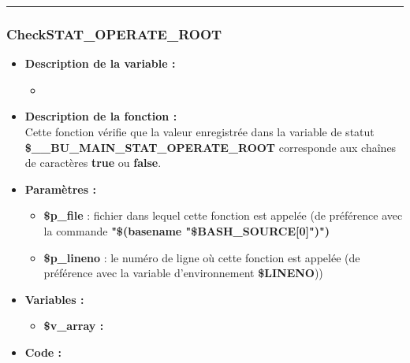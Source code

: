 \documentclass[a4paper,10pt]{article}
\begin{document}
\color{blue}\par\noindent\rule{\textwidth}{0.4pt}\color{white}

\color{blue}
\subsubsection{CheckSTAT\_OPERATE\_ROOT}\color{white}
\begin{itemize}
    \item \textbf{Description de la variable :}
    \begin{itemize}
        \item \textbf{}\\[1\baselineskip]
    \end{itemize}


    \item \textbf{Description de la fonction :}\\
        Cette fonction vérifie que la valeur enregistrée dans la variable de statut\\ \textbf{\color{orange}\$\_\_BU\_MAIN\_STAT\_OPERATE\_ROOT} corresponde aux chaînes de caractères \textbf{true} ou \textbf{false}.\\[1\baselineskip]

    \item \textbf{Paramètres :}
    \begin{itemize}
        \item \color{orange}\textbf{\$p\_file}\color{white} : fichier dans lequel cette fonction est appelée (de préférence avec la commande \textbf{"\$(\color{gray}basename \color{white}"\color{orange}\$BASH\_SOURCE[0]\color{white}")")}\\[1\baselineskip]

        \item \color{orange}\textbf{\$p\_lineno}\color{white} : le numéro de ligne où cette fonction est appelée (de préférence avec la variable d'environnement \textbf{\color{orange}\$LINENO}))\\[1\baselineskip]
    \end{itemize}

    \item \textbf{Variables :}
    \begin{itemize}
        \item \textbf{\color{orange}\$v\_array\color{white} :}\\[1\baselineskip]
    \end{itemize}


    \item \textbf{Code :}
\end{itemize}
\end{document}
